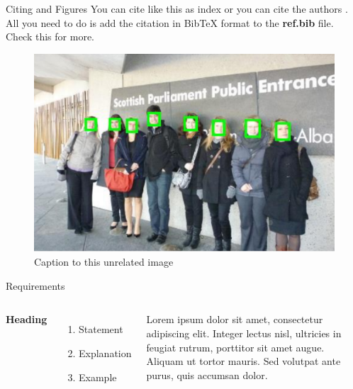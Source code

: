 \documentclass[aspectratio=169,xcolor=dvipsnames]{beamer}
\begin{document}



\begin{frame}{Citing and Figures}
	You can cite like this as index \cite{redmon2016look} or you can cite the authors \citeauthor{redmon2016look}. All you need to do is add the citation in BibTeX format to the \textbf{ref.bib} file. Check this \cite{bib} for more.
	
	
	\begin{figure}
		\centering
		\includegraphics[width=0.4\linewidth]{images/widerface}
		\caption{Caption to this unrelated image}
		\label{fig:widerface}
	\end{figure}
	
\end{frame}

\begin{frame}{Requirements}
	\begin{columns}[c] %
		
		\textbf{Heading}
		\begin{enumerate}
			\item Statement
			\item Explanation
			\item Example
		\end{enumerate}
		
		Lorem ipsum dolor sit amet, consectetur adipiscing elit. Integer lectus nisl, ultricies in feugiat rutrum, porttitor sit amet augue. Aliquam ut tortor mauris. Sed volutpat ante purus, quis accumsan dolor.
		
	\end{columns}
\end{frame}

\end{document}
